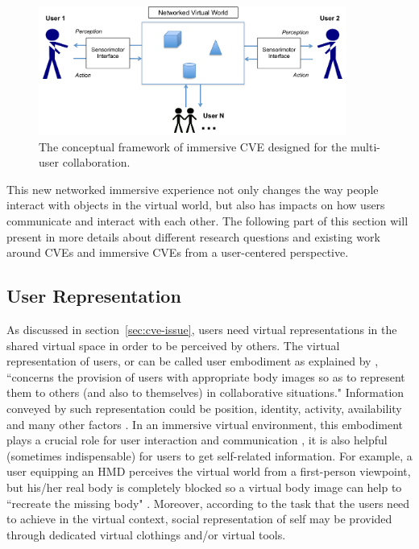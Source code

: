 \begin{figure}[htb]
  \centering
  \includegraphics[width=0.9\textwidth]{figures/ch1/multi_loop}
  \caption{\label{fig:1_multi_loop}The conceptual framework of immersive CVE designed for the multi-user collaboration.}
\end{figure}

This new networked immersive experience not only changes the way people interact with objects in the virtual world, but also has impacts on how users communicate and interact with each other. The following part of this section will present in more details about different research questions and existing work around CVEs and immersive CVEs from a user-centered perspective.

\subsection{User Representation}
As discussed in section~\ref{sec:cve-issue}, users need virtual representations in the shared virtual space in order to be perceived by others. The virtual representation of users, or can be called user embodiment as explained by \citep{Benford1995Embodiment}, ``concerns the provision of users with appropriate body images so as to represent them to others (and also to themselves) in collaborative situations." Information conveyed by such representation could be position, identity, activity, availability and many other factors \citep{Thalmann2001VHR}. In an immersive virtual environment, this embodiment plays a crucial role for user interaction and communication \citep{Slater1994Body}, it is also helpful (sometimes indispensable) for users to get self-related information. For example, a user equipping an HMD perceives the virtual world from a first-person viewpoint, but his/her real body is completely blocked so a virtual body image can help to ``recreate the missing body" \citep{Lok2003Effects, Mohler2010Effect}. Moreover, according to the task that the users need to achieve in the virtual context, social representation of self may be provided through dedicated virtual clothings and/or virtual tools. 

